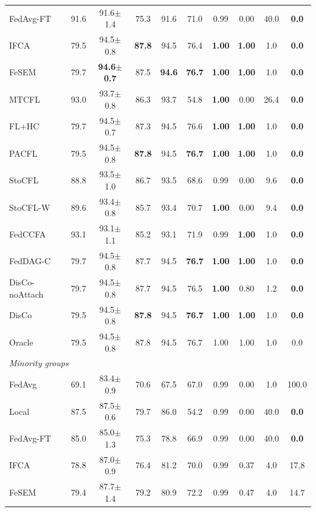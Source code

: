 {\begin{tabular}{lccccccccc}
FedAvg-FT & 91.6 & 91.6$\pm$1.4 & 75.3 & 91.6 & 71.0 & 0.99 & 0.00 & 40.0 & \textbf{0.0} \\
IFCA & 79.5 & 94.5$\pm$0.8 & \textbf{87.8} & 94.5 & 76.4 & \textbf{1.00} & \textbf{1.00} & 1.0 & \textbf{0.0} \\
FeSEM & 79.7 & \textbf{94.6$\pm$0.7} & 87.5 & \textbf{94.6} & \textbf{76.7} & \textbf{1.00} & \textbf{1.00} & 1.0 & \textbf{0.0} \\
MTCFL & 93.0 & 93.7$\pm$0.8 & 86.3 & 93.7 & 54.8 & \textbf{1.00} & 0.00 & 26.4 & \textbf{0.0} \\
FL+HC & 79.7 & 94.5$\pm$0.7 & 87.3 & 94.5 & 76.6 & \textbf{1.00} & \textbf{1.00} & 1.0 & \textbf{0.0} \\
PACFL & 79.5 & 94.5$\pm$0.8 & \textbf{87.8} & 94.5 & \textbf{76.7} & \textbf{1.00} & \textbf{1.00} & 1.0 & \textbf{0.0} \\
StoCFL & 88.8 & 93.5$\pm$1.0 & 86.7 & 93.5 & 68.6 & 0.99 & 0.00 & 9.6 & \textbf{0.0} \\
StoCFL-W & 89.6 & 93.4$\pm$0.8 & 85.7 & 93.4 & 70.7 & \textbf{1.00} & 0.00 & 9.4 & \textbf{0.0} \\
FedCCFA & 93.1 & 93.1$\pm$1.1 & 85.2 & 93.1 & 71.9 & 0.99 & \textbf{1.00} & 1.0 & \textbf{0.0} \\
FedDAG-C & 79.7 & 94.5$\pm$0.8 & 87.7 & 94.5 & \textbf{76.7} & \textbf{1.00} & \textbf{1.00} & 1.0 & \textbf{0.0} \\
DisCo-noAttach & 79.7 & 94.5$\pm$0.8 & 87.7 & 94.5 & 76.5 & \textbf{1.00} & 0.80 & 1.2 & \textbf{0.0} \\
DisCo & 79.5 & 94.5$\pm$0.8 & \textbf{87.8} & 94.5 & \textbf{76.7} & \textbf{1.00} & \textbf{1.00} & 1.0 & \textbf{0.0} \\
Oracle & 79.5 & 94.5$\pm$0.8 & 87.8 & 94.5 & 76.7 & 1.00 & 1.00 & 1.0 & 0.0 \\
\midrule
\multicolumn{10}{l}{\textit{Minority groups}}\\
FedAvg & 69.1 & 83.4$\pm$0.9 & 70.6 & 67.5 & 67.0 & 0.99 & 0.00 & 1.0 & 100.0 \\
Local & 87.5 & 87.5$\pm$0.6 & 79.7 & 86.0 & 54.2 & 0.99 & 0.00 & 40.0 & \textbf{0.0} \\
FedAvg-FT & 85.0 & 85.0$\pm$1.3 & 75.3 & 78.8 & 66.9 & 0.99 & 0.00 & 40.0 & \textbf{0.0} \\
IFCA & 78.8 & 87.0$\pm$0.9 & 76.4 & 81.2 & 70.0 & 0.99 & 0.37 & 4.0 & 17.8 \\
FeSEM & 79.4 & 87.7$\pm$1.4 & 79.2 & 80.9 & 72.2 & 0.99 & 0.47 & 4.0 & 14.7 \\

\end{tabular}}
